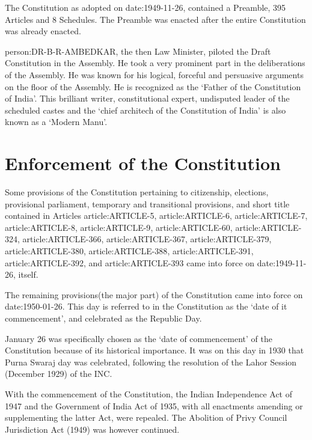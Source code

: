 \begin{multicol}{2}
{ The Constitution as adopted on \gls{date:1949-11-26}, contained a Preamble, 395 Articles and 8 Schedules}. The Preamble was enacted after the entire Constitution was already enacted.

\gls{person:DR-B-R-AMBEDKAR}, the then Law Minister, piloted the Draft Constitution in the Assembly. He took a very prominent part in the deliberations of the Assembly. He was known for his logical, forceful and persuasive arguments on the floor of the Assembly. He is recognized as the `Father of the Constitution of India'. This brilliant writer, constitutional expert, undisputed leader of the scheduled castes and the `chief architech of the Constitution of India' is also known as a `Modern Manu'.

\section{Enforcement of the Constitution}

Some provisions of the Constitution pertaining to citizenship, elections, provisional parliament, temporary and transitional provisions, and short title contained in Articles \gls{article:ARTICLE-5}, \gls{article:ARTICLE-6}, \gls{article:ARTICLE-7}, \gls{article:ARTICLE-8}, \gls{article:ARTICLE-9}, \gls{article:ARTICLE-60}, \gls{article:ARTICLE-324}, \gls{article:ARTICLE-366}, \gls{article:ARTICLE-367}, \gls{article:ARTICLE-379}, \gls{article:ARTICLE-380}, \gls{article:ARTICLE-388}, \gls{article:ARTICLE-391}, \gls{article:ARTICLE-392}, and \gls{article:ARTICLE-393} came into force on \gls{date:1949-11-26}, itself.

The remaining provisions(the major part) of the Constitution came into force on \gls{date:1950-01-26}. This day is referred to in the Constitution as the `date of it commencement', and celebrated as the Republic Day.

January 26 was specifically chosen as the `date of commencement' of the Constitution because of its historical importance. It was on this day in 1930 that { Purna Swaraj} day was celebrated, following the resolution of the Lahor Session (December 1929) of the INC.

With the commencement of the Constitution, the Indian Independence Act of 1947 and the Government of India Act of 1935, with all enactments amending or supplementing the latter Act, were repealed. The Abolition of Privy Council Jurisdiction Act (1949) was however continued.


\end{multicol}

